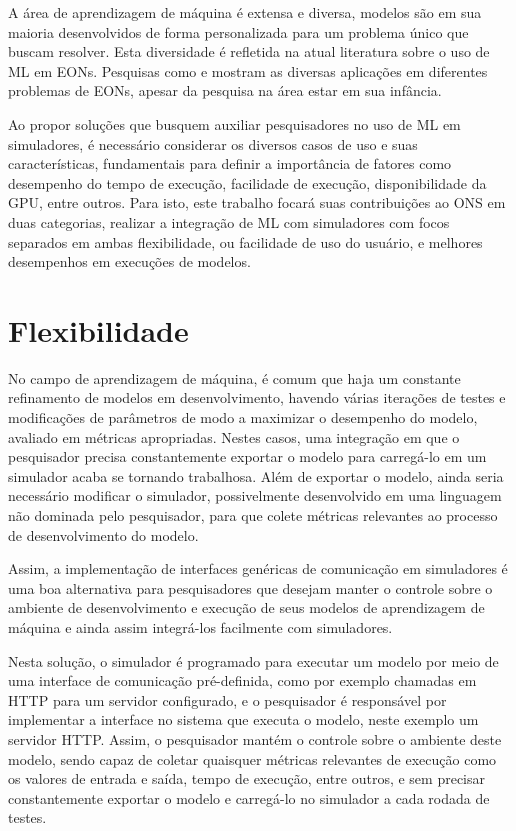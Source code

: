 A área de aprendizagem de máquina é extensa e diversa, modelos são em sua maioria desenvolvidos de forma personalizada para um problema único que buscam resolver. Esta diversidade é refletida na atual literatura sobre o uso de ML em EONs. Pesquisas como \cite{eon_ml_survey_2020} e \cite{8527529} mostram as diversas aplicações em diferentes problemas de EONs, apesar da pesquisa na área estar em sua infância.

Ao propor soluções que busquem auxiliar pesquisadores no uso de ML em simuladores, é necessário considerar os diversos casos de uso e suas características, fundamentais para definir a importância de fatores como desempenho do tempo de execução, facilidade de execução, disponibilidade da GPU, entre outros. Para isto, este trabalho focará suas contribuições ao ONS em duas categorias, realizar a integração de ML com simuladores com focos separados em ambas flexibilidade, ou facilidade de uso do usuário, e melhores desempenhos em execuções de modelos.

\section{Flexibilidade}
\label{flexible}

No campo de aprendizagem de máquina, é comum que haja um constante refinamento de modelos em desenvolvimento, havendo várias iterações de testes e modificações de parâmetros de modo a maximizar o desempenho do modelo, avaliado em métricas apropriadas. Nestes casos, uma integração em que o pesquisador precisa constantemente exportar o modelo para carregá-lo em um simulador acaba se tornando trabalhosa. Além de exportar o modelo, ainda seria necessário modificar o simulador, possivelmente desenvolvido em uma linguagem não dominada pelo pesquisador, para que colete métricas relevantes ao processo de desenvolvimento do modelo.

Assim, a implementação de interfaces genéricas de comunicação em simuladores é uma boa alternativa para pesquisadores que desejam manter o controle sobre o ambiente de desenvolvimento e execução de seus modelos de aprendizagem de máquina e ainda assim integrá-los facilmente com simuladores.

Nesta solução, o simulador é programado para executar um modelo por meio de uma interface de comunicação pré-definida, como por exemplo chamadas em HTTP para um servidor configurado, e o pesquisador é responsável por implementar a interface no sistema que executa o modelo, neste exemplo um servidor HTTP. Assim, o pesquisador mantém o controle sobre o ambiente deste modelo, sendo capaz de coletar quaisquer métricas relevantes de execução como os valores de entrada e saída, tempo de execução, entre outros, e sem precisar constantemente exportar o modelo e carregá-lo no simulador a cada rodada de testes.

